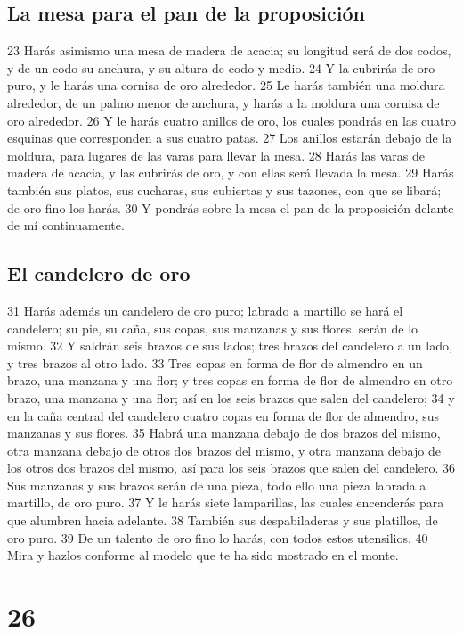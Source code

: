 \section*{La mesa para el pan de la proposición}

23 Harás asimismo una mesa de madera de acacia; su longitud será de dos codos,   y de un codo su anchura, y su altura de codo y medio.
24 Y la cubrirás de oro puro, y le harás una cornisa de oro alrededor.
25 Le harás también una moldura alrededor, de un palmo menor   de anchura, y harás a la moldura una cornisa de oro alrededor.
26 Y le harás cuatro anillos de oro, los cuales pondrás en las cuatro esquinas que corresponden a sus cuatro patas.
27 Los anillos estarán debajo de la moldura, para lugares de las varas para llevar la mesa.
28 Harás las varas de madera de acacia, y las cubrirás de oro, y con ellas será llevada la mesa.
29 Harás también sus platos, sus cucharas, sus cubiertas y sus tazones, con que se libará; de oro fino los harás.
30 Y pondrás sobre la mesa el pan de la proposición delante de mí continuamente.

\section*{El candelero de oro}

31 Harás además un candelero de oro puro; labrado a martillo se hará el candelero; su pie, su caña, sus copas, sus manzanas y sus flores, serán de lo mismo.
32 Y saldrán seis brazos de sus lados; tres brazos del candelero a un lado, y tres brazos al otro lado.
33 Tres copas en forma de flor de almendro en un brazo, una manzana y una flor; y tres copas en forma de flor de almendro en otro brazo, una manzana y una flor; así en los seis brazos que salen del candelero;
34 y en la caña central del candelero cuatro copas en forma de flor de almendro, sus manzanas y sus flores.
35 Habrá una manzana debajo de dos brazos del mismo, otra manzana debajo de otros dos brazos del mismo, y otra manzana debajo de los otros dos brazos del mismo, así para los seis brazos que salen del candelero.
36 Sus manzanas y sus brazos serán de una pieza, todo ello una pieza labrada a martillo, de oro puro.
37 Y le harás siete lamparillas, las cuales encenderás para que alumbren hacia adelante.
38 También sus despabiladeras y sus platillos, de oro puro.
39 De un talento de oro   fino lo harás, con todos estos utensilios.
40 Mira y hazlos conforme al modelo que te ha sido mostrado en el monte.

\chapter{26}


